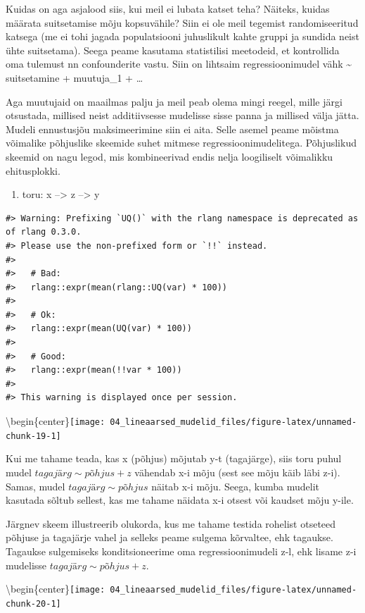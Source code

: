 \documentclass[]{book}
\providecommand{\tightlist}{%
  \setlength{\itemsep}{0pt}\setlength{\parskip}{0pt}}
\begin{document}
Kuidas on aga asjalood siis, kui meil ei lubata katset teha? Näiteks, kuidas määrata suitsetamise mõju kopsuvähile? Siin ei ole meil tegemist randomiseeritud katsega (me ei tohi jagada populatsiooni juhuslikult kahte gruppi ja sundida neist ühte suitsetama). Seega peame kasutama statistilisi meetodeid, et kontrollida oma tulemust nn confounderite vastu. Siin on lihtsaim regressioonimudel vähk \textasciitilde{} suitsetamine + muutuja\_1 + \ldots{}

Aga muutujaid on maailmas palju ja meil peab olema mingi reegel, mille järgi otsustada, millised neist additiivsesse mudelisse sisse panna ja millised välja jätta. Mudeli ennustusjõu maksimeerimine siin ei aita. Selle asemel peame mõistma võimalike põhjuslike skeemide suhet mitmese regressioonimudelitega. Põhjuslikud skeemid on nagu legod, mis kombineerivad endis nelja loogiliselt võimalikku ehitusplokki.

\begin{enumerate}
\def\labelenumi{\arabic{enumi}.}
\tightlist
\item
  toru: x --\textgreater{} z --\textgreater{} y
\end{enumerate}

\begin{verbatim}
#> Warning: Prefixing `UQ()` with the rlang namespace is deprecated as of rlang 0.3.0.
#> Please use the non-prefixed form or `!!` instead.
#> 
#>   # Bad:
#>   rlang::expr(mean(rlang::UQ(var) * 100))
#> 
#>   # Ok:
#>   rlang::expr(mean(UQ(var) * 100))
#> 
#>   # Good:
#>   rlang::expr(mean(!!var * 100))
#> 
#> This warning is displayed once per session.
\end{verbatim}

\textbackslash{}begin\{center\}\texttt{[image: 04\_lineaarsed\_mudelid\_files/figure-latex/unnamed-chunk-19-1]}

Kui me tahame teada, kas x (põhjus) mõjutab y-t (tagajärge), siis toru puhul mudel \(tagajärg \sim põhjus + z\) vähendab x-i mõju (sest see mõju käib läbi z-i). Samas, mudel \(tagajärg \sim põhjus\) näitab x-i mõju. Seega, kumba mudelit kasutada sõltub sellest, kas me tahame näidata x-i otsest või kaudset mõju y-ile.

Järgnev skeem illustreerib olukorda, kus me tahame testida rohelist otseteed põhjuse ja tagajärje vahel ja selleks peame sulgema kõrvaltee, ehk tagaukse. Tagaukse sulgemiseks konditsioneerime oma regressioonimudeli z-l, ehk lisame z-i mudelisse \(tagajärg \sim põhjus + z\).

\textbackslash{}begin\{center\}\texttt{[image: 04\_lineaarsed\_mudelid\_files/figure-latex/unnamed-chunk-20-1]}
\end{document}
